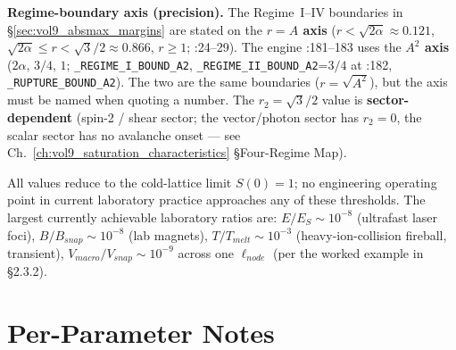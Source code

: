 \noindent
\textbf{Regime-boundary axis (precision).} The Regime~I--IV boundaries in \S\ref{sec:vol9_absmax_margins} are stated on the \textbf{$r = A$ axis} ($r < \sqrt{2\alpha} \approx 0.121$, $\sqrt{2\alpha} \le r < \sqrt{3}/2 \approx 0.866$, $r \ge 1$; :24--29). The engine :181--183 uses the \textbf{$A^2$ axis} ($2\alpha$, $3/4$, $1$; \texttt{\_REGIME\_I\_BOUND\_A2}, \texttt{\_REGIME\_II\_BOUND\_A2}=$3/4$ at :182, \texttt{\_RUPTURE\_BOUND\_A2}). The two are the same boundaries ($r = \sqrt{A^2}$), but the axis must be named when quoting a number. The $r_2 = \sqrt{3}/2$ value is \textbf{sector-dependent} (spin-2 / shear sector; the vector/photon sector has $r_2 = 0$, the scalar sector has no avalanche onset --- see Ch.~\ref{ch:vol9_saturation_characteristics} \S Four-Regime Map).

\noindent
All values reduce to the cold-lattice limit $S(0) = 1$; no engineering operating point in current laboratory practice approaches any of these thresholds. The largest currently achievable laboratory ratios are: $E/E_S \sim 10^{-8}$ (ultrafast laser foci), $B/B_{snap} \sim 10^{-8}$ (lab magnets), $T/T_{melt} \sim 10^{-3}$ (heavy-ion-collision fireball, transient), $V_{macro}/V_{snap} \sim 10^{-9}$ across one $\ell_{node}$ (per the worked example in  \S 2.3.2).

\section{Per-Parameter Notes}
\label{sec:vol9_absmax_per_param}

